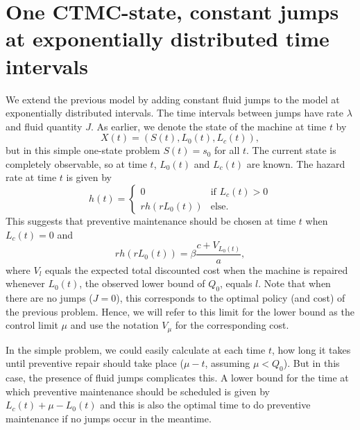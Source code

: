 \section{One CTMC-state, constant jumps at exponentially distributed time intervals}
We extend the previous model by adding constant fluid jumps to the model at exponentially distributed intervals.
The time intervals between jumps have rate $\lambda$ and fluid quantity $J$.
As earlier, we denote the state of the machine at time $t$ by
$$
X(t)=(S(t),L_0(t),L_c(t)),
$$
but in this simple one-state problem $S(t)=s_0$ for all $t$.
The current state is completely observable, so at time $t$, $L_0(t)$ and $L_c(t)$ are known.
The hazard rate at time $t$ is given by
\begin{equation}
h(t)=\begin{cases}
0&\text{if }L_c(t)>0\\
rh(rL_0(t))&\text{else.}
\end{cases}
\end{equation} 
This suggests that preventive maintenance should be chosen at time $t$ when $L_c(t)=0$ and
\begin{equation}
rh(rL_0(t))=\beta\frac{c+V_{L_0(t)}}{a},
\end{equation}
where $V_{l}$ equals the expected total discounted cost when the machine is repaired whenever $L_0(t)$, the observed lower bound of $Q_0$, equals $l$.
Note that when there are no jumps ($J=0$), this corresponds to the optimal policy (and cost) of the previous problem.
Hence, we will refer to this limit for the lower bound as the control limit $\mu$ and use the notation $V_\mu$ for the corresponding cost.

In the simple problem, we could easily calculate at each time $t$, how long it takes until preventive repair should take place ($\mu-t$, assuming $\mu<Q_0$).
But in this case, the presence of fluid jumps complicates this.
A lower bound for the time at which preventive maintenance should be scheduled is given by $L_c(t)+\mu-L_0(t)$ and this is also the optimal time to do preventive maintenance if no jumps occur in the meantime.

